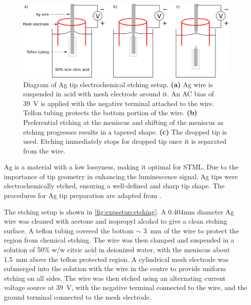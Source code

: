 \begin{figure} [H]
    \centering
    
    \includegraphics[width=\textwidth]{pictures/etch_diagram.png}
    
    \caption{Diagram of Ag tip electrochemical etching setup. \textbf{(a)} Ag wire is suspended in acid with mesh electrode around it. An AC bias of \SI{39}{V} is applied with the negative terminal attached to the wire. Telfon tubing protects the bottom portion of the wire. \textbf{(b)} Preferential etching at the meniscus and shifting of the meniscus as etching progresses results in a tapered shape. \textbf{(c)} The dropped tip is used. Etching immediately stops for dropped tip once it is separated from the wire. }
    \label{fig:expsetup:etching}
\end{figure}

Ag is a material with a low lossyness, making it optimal for \ac{STML}. Due to the importance of tip geometry in enhancing the luminescence signal, Ag tips were electrochemically etched, ensuring a well-defined and sharp tip shape. The procedures for Ag tip preparation are adapted from \citep{roussy2016coupling, zhang2011fabrication}. 

The etching setup is shown in \autoref{fig:expsetup:etching}. A 0.404mm diameter Ag wire was cleaned with acetone and isopropyl alcohol to give a clean etching surface. A teflon tubing covered the bottom $\sim$ \SI{3}{mm} of the wire to protect the region from chemical etching. The wire was then clamped and suspended in a solution of 50\% w/w citric acid in deionized water, with the meniscus about \SI{1.5}{mm} above the teflon protected region. A cylindrical mesh electrode was submerged into the solution with the wire in the centre to provide uniform etching on all sides. The wire was then etched using an alternating current voltage source at \SI{39}{V}, with the negative terminal connected to the wire, and the ground terminal connected to the mesh electrode. 

